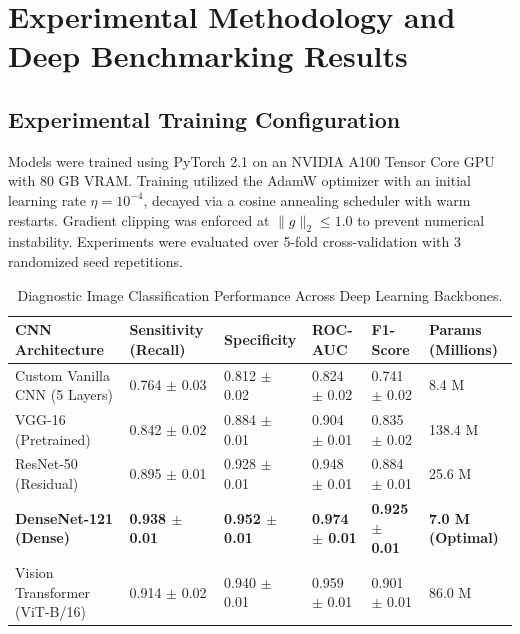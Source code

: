 \section{Experimental Methodology and Deep Benchmarking Results}

\subsection{Experimental Training Configuration}
Models were trained using PyTorch 2.1 on an NVIDIA A100 Tensor Core GPU with 80 GB VRAM. Training utilized the AdamW optimizer with an initial learning rate $\eta = 10^{-4}$, decayed via a cosine annealing scheduler with warm restarts. Gradient clipping was enforced at $\|g\|_2 \le 1.0$ to prevent numerical instability. Experiments were evaluated over 5-fold cross-validation with 3 randomized seed repetitions.

\begin{table}[H]
\centering
\caption{Diagnostic Image Classification Performance Across Deep Learning Backbones.}
\label{tab:dl_comp}
\begin{tabularx}{\linewidth}{lXXXXX}
\toprule
\textbf{CNN Architecture} & \textbf{Sensitivity (Recall)} & \textbf{Specificity} & \textbf{ROC-AUC} & \textbf{F1-Score} & \textbf{Params (Millions)} \\
\midrule
Custom Vanilla CNN (5 Layers) & 0.764 $\pm$ 0.03 & 0.812 $\pm$ 0.02 & 0.824 $\pm$ 0.02 & 0.741 $\pm$ 0.02 & 8.4 M \\
VGG-16 (Pretrained) & 0.842 $\pm$ 0.02 & 0.884 $\pm$ 0.01 & 0.904 $\pm$ 0.01 & 0.835 $\pm$ 0.02 & 138.4 M \\
ResNet-50 (Residual) & 0.895 $\pm$ 0.01 & 0.928 $\pm$ 0.01 & 0.948 $\pm$ 0.01 & 0.884 $\pm$ 0.01 & 25.6 M \\
\textbf{DenseNet-121 (Dense)} & \textbf{0.938 $\pm$ 0.01} & \textbf{0.952 $\pm$ 0.01} & \textbf{0.974 $\pm$ 0.01} & \textbf{0.925 $\pm$ 0.01} & \textbf{7.0 M (Optimal)} \\
Vision Transformer (ViT-B/16) & 0.914 $\pm$ 0.02 & 0.940 $\pm$ 0.01 & 0.959 $\pm$ 0.01 & 0.901 $\pm$ 0.01 & 86.0 M \\
\bottomrule
\end{tabularx}
\end{table}


